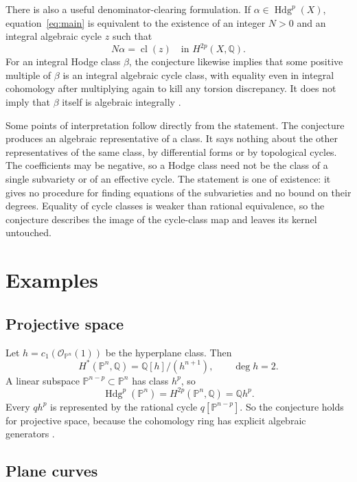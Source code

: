 \documentclass[11pt,reqno]{amsart}
\theoremstyle{definition}
\theoremstyle{remark}
\numberwithin{equation}{section}
\newcommand{\Q}{\mathbb{Q}}
\newcommand{\PP}{\mathbb{P}}
\newcommand{\OO}{\mathcal{O}}
\DeclareMathOperator{\Hdg}{Hdg}
\DeclareMathOperator{\cl}{cl}
\begin{document}
There is also a useful denominator-clearing formulation. If
$\alpha\in\Hdg^p(X)$, equation~\eqref{eq:main} is equivalent to the
existence of an integer $N>0$ and an integral algebraic cycle $z$ such that
\begin{equation}\label{eq:multiple}
 N\alpha=\cl(z)\quad\text{in }H^{2p}(X,\Q).
\end{equation}
For an integral Hodge class $\beta$, the conjecture likewise implies that
some positive multiple of $\beta$ is an integral algebraic cycle class,
with equality even in integral cohomology after multiplying again to kill
any torsion discrepancy. It does not imply that $\beta$ itself is algebraic
integrally \cite{delignecmi2006}.

Some points of interpretation follow directly from the statement. The
conjecture produces an algebraic representative of a class. It says nothing
about the other representatives of the same class, by differential forms or
by topological cycles. The coefficients may be negative, so a Hodge class
need not be the class of a single subvariety or of an effective cycle. The
statement is one of existence: it gives no procedure for finding equations
of the subvarieties and no bound on their degrees. Equality of cycle classes
is weaker than rational equivalence, so the conjecture describes the image
of the cycle-class map and leaves its kernel untouched.

\section{Examples}\label{sec:examples}

\subsection{Projective space}

Let $h=c_1(\OO_{\PP^n}(1))$ be the hyperplane class. Then
\[
 H^*(\PP^n,\Q)=\Q[h]/(h^{n+1}),\qquad \deg h=2.
\]
A linear subspace $\PP^{n-p}\subset\PP^n$ has class $h^p$, so
\[
 \Hdg^p(\PP^n)=H^{2p}(\PP^n,\Q)=\Q h^p.
\]
Every $qh^p$ is represented by the rational cycle $q[\PP^{n-p}]$.
So the conjecture holds for projective space, because the cohomology ring
has explicit algebraic generators \cite{hatcher2002,griffithsharris1978}.

\subsection{Plane curves}
\end{document}
